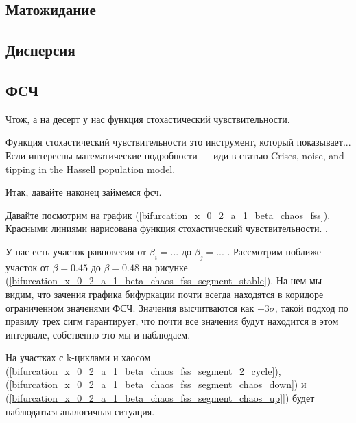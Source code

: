 
    \subsection{Матожидание}


    \subsection{Дисперсия}


    \subsection{ФСЧ}
    
        Чтож, а на десерт у нас функция стохастический чувствительности.

        Функция стохастический чувствительности это инструмент, который показывает... Если интересны математические подробности --- иди в статью Crises, noise, and tipping in the Hassell population model.

        Итак, давайте наконец займемся фсч. 

        Давайте посмотрим на график (\ref{bifurcation_x_0_2_a_1_beta_chaos_fss}). Красными линиями нарисована функция стохастический чувствительности. . 

        У нас есть участок равновесия от \(\beta_i = ...\) до \(\beta_j = ...\) . Рассмотрим поближе участок от \(\beta = 0.45\) до \(\beta = 0.48\) на рисунке (\ref{bifurcation_x_0_2_a_1_beta_chaos_fss_segment_stable}). На нем мы видим, что зачения графика бифуркации почти всегда находятся в коридоре ограниченном значенями ФСЧ. Значения высчитваются как \(\pm 3 \sigma\), такой подход по правилу трех сигм гарантирует, что почти все значения будут находится в этом интервале, собственно это мы и наблюдаем.

        На участках с k-циклами и хаосом (\ref{bifurcation_x_0_2_a_1_beta_chaos_fss_segment_2_cycle}), (\ref{bifurcation_x_0_2_a_1_beta_chaos_fss_segment_chaos_down}) и (\ref{bifurcation_x_0_2_a_1_beta_chaos_fss_segment_chaos_up]}) будет наблюдаться аналогичная ситуация. 

